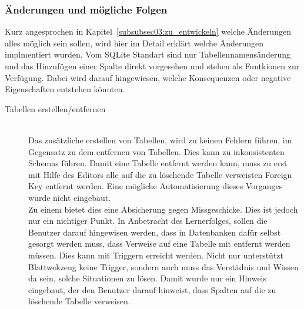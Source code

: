 \subsubsection{Änderungen und mögliche Folgen}
\label{subsubsec04:editor_moegliche_aenderungen}
Kurz angesprochen in Kapitel~\ref{subsubsec03:zu_entwickeln} welche Änderungen alles möglich sein sollen, wird hier im Detail erklärt welche Änderungen implmentiert wurden. Vom SQLite Standart sind nur Tabellennamensänderung und das Hinzufügen einer Spalte direkt vorgesehen und stehen als Funtkionen zur Verfügung. Dabei wird darauf hingewiesen, welche Konsequenzen oder negative Eigenschaften entstehen könnten.

\begin{description}
\item[Tabellen erstellen/entfernen] \hfill\\
Das zusätzliche erstellen von Tabellen, wird zu keinen Fehlern führen, im Gegensatz zu dem entfernen von Tabellen. Dies kann zu inkonsistenten Schemas führen. Damit eine Tabelle entfernt werden kann, muss zu erst mit Hilfe des Editors alle auf die zu löschende Tabelle verweisten Foreign Key entfernt werden. Eine mögliche Automatisierung dieses Vorganges wurde nicht eingebaut. \\
Zu einem bietet dies eine Absicherung gegen Missgeschicke. Dies ist jedoch nur ein nichtiger Punkt. In Anbetracht des Lernerfolges, sollen die Benutzer darauf hingewisen werden, dass in Datenbanken dafür selbst gesorgt werden muss, dass Verweise auf eine Tabelle mit entfernt werden müssen. Dies kann mit Triggern erreicht werden. Nicht nur unterstützt Blattwekzeug keine Trigger, sondern auch muss das Verstädnis und Wissen da sein, solche Situationen zu lösen. Damit wurde nur ein Hinweis eingebaut, der den Benutzer darauf hinweist, dass Spalten auf die zu löschende Tabelle verweisen. 


\end{description}
